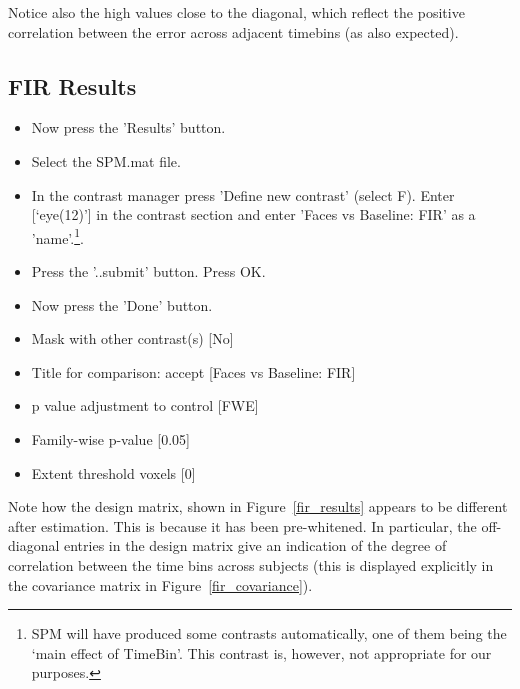 \documentclass[a4paper,titlepage]{book}
\newcommand{\bi}{\begin{itemize}}
\newcommand{\ei}{\end{itemize}}
\begin{document}
Notice also the high values close to the diagonal, which reflect the positive correlation between the error across adjacent timebins (as also expected).

\subsection{FIR Results}

\bi
\item{Now press the 'Results' button.}
\item{Select the SPM.mat file.}
\item{In the contrast manager press 'Define new contrast' (select F). Enter [`eye(12)'] in the contrast section and enter 'Faces vs Baseline: FIR' as a 'name'.\footnote{SPM will have produced some contrasts automatically, one of them being the `main effect of TimeBin'. This contrast is, however, not 
appropriate for our purposes.}.}
\item{Press the '..submit' button. Press OK.}
\item{Now press the 'Done' button.}
\item{Mask with other contrast(s) [No]}
\item{Title for comparison: accept [Faces vs Baseline: FIR]}
\item{p value adjustment to control [FWE]}
\item{Family-wise p-value [0.05]}
\item{Extent threshold {voxels} [0]}
\ei
Note how the design matrix, shown in Figure~\ref{fir_results} appears to be different after estimation. This is because it has been pre-whitened. In particular, the off-diagonal entries in the design matrix give an indication of the degree of correlation between the time bins across subjects (this is displayed explicitly in the covariance matrix in Figure~\ref{fir_covariance}).
\end{document}
